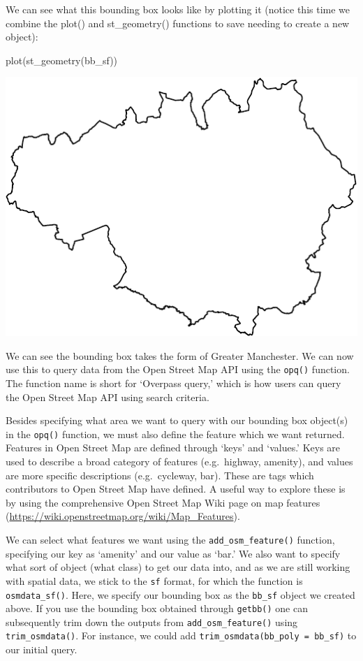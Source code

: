 \documentclass[
  krantz2]{krantz}
\makeatletter
\newenvironment{Shaded}{\begin{snugshade}}{\end{snugshade}}
\newcommand{\FunctionTok}[1]{\textcolor[rgb]{0,0,0}{#1}}
\newcommand{\NormalTok}[1]{#1}
\newenvironment{kframe}{%
\medskip{}
\setlength{\fboxsep}{.8em}
 \def\at@end@of@kframe{}%
 \ifinner\ifhmode%
  \def\at@end@of@kframe{\end{minipage}}%
  \begin{minipage}{\columnwidth}%
 \fi\fi%
 \def\FrameCommand##1{\hskip\@totalleftmargin \hskip-\fboxsep
 \colorbox{shadecolor}{##1}\hskip-\fboxsep
     \hskip-\linewidth \hskip-\@totalleftmargin \hskip\columnwidth}%
 \MakeFramed {\advance\hsize-\width
   \@totalleftmargin\z@ \linewidth\hsize
   \@setminipage}}%
 {\par\unskip\endMakeFramed%
 \at@end@of@kframe}
\renewenvironment{Shaded}{\begin{kframe}}{\end{kframe}}
\makeatother
\begin{document}
We can see what this bounding box looks like by plotting it (notice this time we combine the plot() and st\_geometry() functions to save needing to create a new object):

\begin{Shaded}
\begin{Highlighting}[]
\FunctionTok{plot}\NormalTok{(}\FunctionTok{st\_geometry}\NormalTok{(bb\_sf))}
\end{Highlighting}
\end{Shaded}

\includegraphics{crime_mapping_files/figure-latex/plot_bb-1.pdf}

We can see the bounding box takes the form of Greater Manchester. We can now use this to query data from the Open Street Map API using the \texttt{opq()} function. The function name is short for `Overpass query,' which is how users can query the Open Street Map API using search criteria.

Besides specifying what area we want to query with our bounding box object(s) in the \texttt{opq()} function, we must also define the feature which we want returned. Features in Open Street Map are defined through `keys' and `values.' Keys are used to describe a broad category of features (e.g.~highway, amenity), and values are more specific descriptions (e.g.~cycleway, bar). These are tags which contributors to Open Street Map have defined. A useful way to explore these is by using the comprehensive Open Street Map Wiki page on map features (\url{https://wiki.openstreetmap.org/wiki/Map_Features}).

We can select what features we want using the \texttt{add\_osm\_feature()} function, specifying our key as `amenity' and our value as `bar.' We also want to specify what sort of object (what class) to get our data into, and as we are still working with spatial data, we stick to the \texttt{sf} format, for which the function is \texttt{osmdata\_sf()}. Here, we specify our bounding box as the \texttt{bb\_sf} object we created above. If you use the bounding box obtained through \texttt{getbb()} one can subsequently trim down the outputs from \texttt{add\_osm\_feature()} using \texttt{trim\_osmdata()}. For instance, we could add \texttt{trim\_osmdata(bb\_poly\ =\ bb\_sf)} to our initial query.
\end{document}

